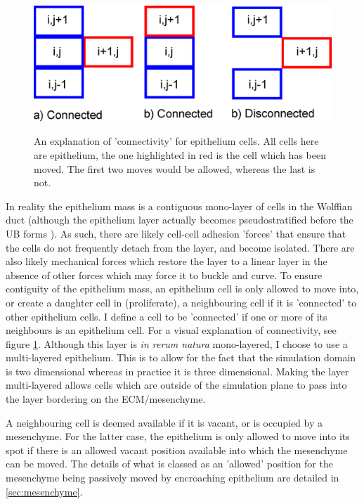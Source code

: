 \documentclass[pdftex,10pt,a4paper,twocolumn]{article}
\begin{document}
\begin{figure}[t] 
\centering
\scalebox{0.5} 
{\includegraphics{connected.eps}}
\caption{An explanation of 'connectivity' for epithelium cells. All cells here are epithelium, the one highlighted in red is the cell which has been moved. The first two moves would be allowed, whereas the last is not.}\label{fig:connected}
\end{figure} 


In reality the epithelium mass is a contiguous mono-layer of cells in the Wolffian duct (although the epithelium layer actually becomes pseudostratified before the UB forms \cite{Chi2009}). As such, there are likely cell-cell adhesion 'forces' that ensure that the cells do not frequently detach from the layer, and become isolated. There are also likely mechanical forces which restore the layer to a linear layer in the absence of other forces which may force it to buckle and curve. To ensure contiguity of the epithelium mass, an epithelium cell is only allowed to move into, or create a daughter cell in (proliferate), a neighbouring cell if it is 'connected' to other epithelium cells. I define a cell to be 'connected' if one or more of its neighbours is an epithelium cell. For a visual explanation of connectivity, see figure \ref{fig:connected}. Although this layer is \textit{in rerum natura} mono-layered, I choose to use a multi-layered epithelium. This is to allow for the fact that the simulation domain is two dimensional whereas in practice it is three dimensional. Making the layer multi-layered allows cells which are outside of the simulation plane to pass into the layer bordering on the ECM/mesenchyme.

A neighbouring cell is deemed available if it is vacant, or is occupied by a mesenchyme. For the latter case, the epithelium is only allowed to move into its spot if there is an allowed vacant position available into which the mesenchyme can be moved. The details of what is classed as an 'allowed' position for the mesenchyme being passively moved by encroaching epithelium are detailed in \ref{sec:mesenchyme}.
\end{document}
